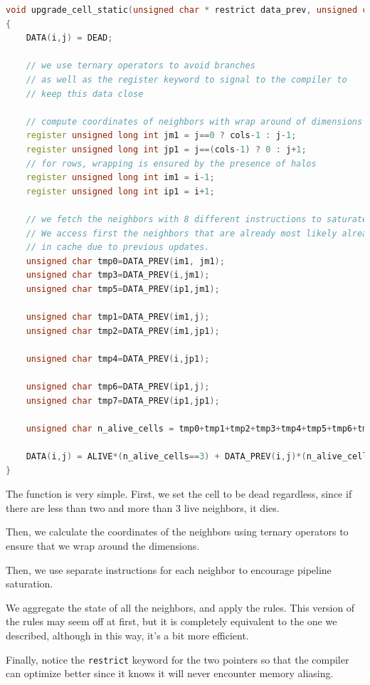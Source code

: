 \documentclass{report}
\begin{document}
\begin{lstlisting}[language=C++]
void upgrade_cell_static(unsigned char * restrict data_prev, unsigned char * restrict data, unsigned long int i, unsigned long int j)
{
    DATA(i,j) = DEAD;

    // we use ternary operators to avoid branches
    // as well as the register keyword to signal to the compiler to 
    // keep this data close

    // compute coordinates of neighbors with wrap around of dimensions
    register unsigned long int jm1 = j==0 ? cols-1 : j-1;
    register unsigned long int jp1 = j==(cols-1) ? 0 : j+1;
    // for rows, wrapping is ensured by the presence of halos
    register unsigned long int im1 = i-1;
    register unsigned long int ip1 = i+1;
    
    // we fetch the neighbors with 8 different instructions to saturate pipelines.
    // We access first the neighbors that are already most likely already 
    // in cache due to previous updates.
    unsigned char tmp0=DATA_PREV(im1, jm1);
    unsigned char tmp3=DATA_PREV(i,jm1);
    unsigned char tmp5=DATA_PREV(ip1,jm1);

    unsigned char tmp1=DATA_PREV(im1,j);
    unsigned char tmp2=DATA_PREV(im1,jp1);

    unsigned char tmp4=DATA_PREV(i,jp1);

    unsigned char tmp6=DATA_PREV(ip1,j);
    unsigned char tmp7=DATA_PREV(ip1,jp1);

    unsigned char n_alive_cells = tmp0+tmp1+tmp2+tmp3+tmp4+tmp5+tmp6+tmp7;

    DATA(i,j) = ALIVE*(n_alive_cells==3) + DATA_PREV(i,j)*(n_alive_cells==2);
}
\end{lstlisting}

The function is very simple. First, we set the cell to be dead regardless, since 
if there are less than two and more than 3 live neighbors, it dies.

Then, we calculate the coordinates of the neighbors using ternary operators to 
ensure that we wrap around the dimensions. 

Then, we use separate instructions for each neighbor to encourage pipeline 
saturation.

We aggregate the state of all the neighbors, and apply the rules. 
This version of the rules may seem off at first, but it is completely 
equivalent to the one we described, although in this way, it's a bit more efficient.

Finally, notice the \texttt{restrict} keyword for the two pointers so that the 
compiler can optimize better since it knows it will never encounter memory 
aliasing.
\end{document}
